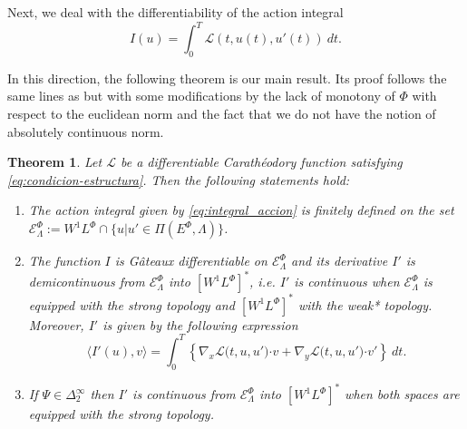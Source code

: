 \documentclass[twoside]{article}
\newtheorem{thm}{Theorem}[section]
\theoremstyle{remark}
\newcommand{\lphi}{L^{\Phi}}
\newcommand{\ephi}{E^{\Phi}}
\newcommand{\wphi}{W^{1}\lphi}
\newcommand{\domi}{\mathcal{E}^{\Phi}}
\renewcommand{\b}[1]{\boldsymbol{#1}}
\newcommand{\ccdot}{\b{\cdot}}
\begin{document}
Next, we deal with the differentiability of the action integral 
\begin{equation}\label{eq:integral_accion}
I(u)=\int_{0}^T \mathcal{L}(t,u(t),u'(t))\ dt.
\end{equation}

In this direction, the following theorem is our main result. Its proof follows the same lines as \cite[Th. 3.2]{ABGMS2015} but with some modifications by the lack of monotony of $\Phi$ with  respect to the euclidean norm and the fact that we do not have the notion of absolutely continuous norm.


\begin{thm}\label{teo:diferenciabilidad}
Let $\mathcal{L}$ be a differentiable Carath\'eodory function satisfying \eqref{eq:condicion-estructura}.
Then the following statements hold:
\begin{enumerate}
\item \label{it:T1item1} \label{A1} The action integral given by \eqref{eq:integral_accion}
is finitely defined on the set $\domi_{\Lambda}:=W^{1}\lphi\cap\{u|u'\in\Pi(\ephi,\Lambda)\}$.

\item\label{it:T1item3} The function  $I$ is G\^ateaux differentiable on $\domi_{\Lambda}$ and  its derivative $I'$ is demicontinuous from 
$\domi_{\Lambda}$  into $\left[\wphi \right]^*$, i.e. $I'$ is continuous when $\domi_{\Lambda}$ is equipped with the strong topology and   $\left[\wphi \right]^*$ with the weak* topology. Moreover, $I'$ is given by the following expression
\begin{equation}\label{eq:DerAccion}
\langle  I'(u),v\rangle= \int_0^T \left\{\nabla_x\mathcal{L}\big(t,u,u'\big)\ccdot v
+ \nabla_y\mathcal{L}\big(t,u,u'\big)\ccdot v'\right\} \ dt.
\end{equation}

\item\label{it:T1item4}  If  $\Psi \in \Delta^{\infty}_2$ then 
  $I'$ is continuous from $\domi_{\Lambda}$ into $\left[\wphi\right]^*$ when both spaces are equipped with the strong topology.
\end{enumerate}
\end{thm}
\end{document}
